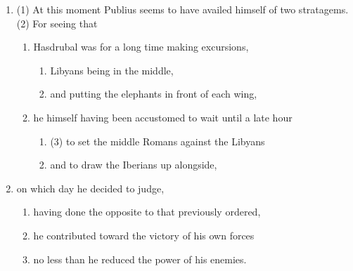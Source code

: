 \documentclass[12pt,letterpaper,oneside,final]{memoir}
\begin{document}
\begin{greek} 
\begin{enumerate} \SingleSpacing 
\item (1) At this moment Publius seems to have availed himself of two stratagems. (2) For seeing that 
  \begin{enumerate}
  \item Hasdrubal was for a long time making excursions,
    \begin{enumerate}
    \item Libyans being in the middle, 
    \item and putting the elephants in front of each wing, 
    \end{enumerate}
  \item he himself having been accustomed to wait until a late hour
    \begin{enumerate}
    \item (3) to set the middle Romans against the Libyans 
    \item and to draw the Iberians up alongside, 
    \end{enumerate}
  \end{enumerate}
\item on which day he decided to judge, 
  \begin{enumerate}
  \item having done the opposite to that previously ordered,
  \item he contributed toward the victory of his own forces 
  \item no less than he reduced the power of his enemies. 
  \end{enumerate}
\end{enumerate} \DoubleSpacing \end{greek}
\end{document}

